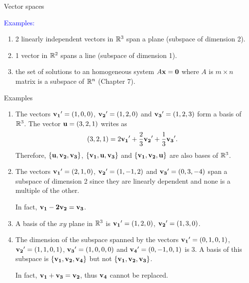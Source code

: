 \documentclass[11pt,aspectratio=169]{beamer}
\begin{document}
\begin{frame}{Vector spaces}



\textcolor{blue}{Examples:} 
\begin{enumerate}
\item 2 linearly independent vectors in $\mathbb R^3$ span a plane (subspace of dimension 2).
\item 1 vector in $\mathbb R^2$ spans a line (subspace of dimension 1).
\item the set of solutions to an homogeneous system  $A\bf{x}=\bf{0}$  where $A$ is $m \times n$ matrix is a subspace of $\mathbb R^n$ (Chapter 7).
\end{enumerate}
\end{frame}


\begin{frame}{Examples}

\begin{enumerate}
\item  The vectors ${\bf v_1}'=(1,0,0)$, ${\bf v_2}'=(1,2,0)$ and ${\bf v_3}'=(1,2,3)$ form a basis of $\mathbb R^3$.
The vector ${\bf u}=(3,2,1)$ writes as $$(3,2,1)=2{\bf v_1}'+\frac23{\bf v_2}'+\frac13 {\bf v_3}'.$$
Therefore, $\{\bf{u}, \bf{v}_2, \bf{v}_3\}$, $\{\bf{v}_1, \bf{u}, \bf{v}_3\}$ and $\{\bf{v}_1, \bf{v}_2, \bf{u}\}$ are also bases of $\mathbb R^3$.

\item The vectors ${\bf v_1}'=(2,1,0)$, ${\bf v_2}'=(1,-1,2)$ and ${\bf v_3}'=(0,3, -4)$ span a subspace of dimension 2 since they are linearly dependent and none is a multiple of the other. \begin{tiny}In fact, $\bf{v}_1-2\bf{v}_2=\bf{v}_3$. \end{tiny}

\item A basis of the $xy$ plane in $\mathbb R^3$ is ${\bf v_1}'=(1,2,0)$, ${\bf v_2}'=(1,3,0)$. 

\item The dimension of the subspace spanned by the vectors
${\bf v_1}'=(0,1,0,1)$, ${\bf v_2}'=(1,1,0,1)$, ${\bf v_3}'=(1,0,0,0)$
and ${\bf v_4}'=(0,-1,0,1)$ is 3. A basis of this subspace is $\{\bf{v}_1, \bf{v}_2, \bf{v}_4\}$ but not $\{\bf{v}_1, \bf{v}_2, \bf{v}_3\}$. \begin{tiny}In fact, $\bf{v}_1+\bf{v}_3=\bf{v}_2$, thus $\bf{v}_4$ cannot be replaced. \end{tiny}
\end{enumerate}\end{frame}
\end{document}
